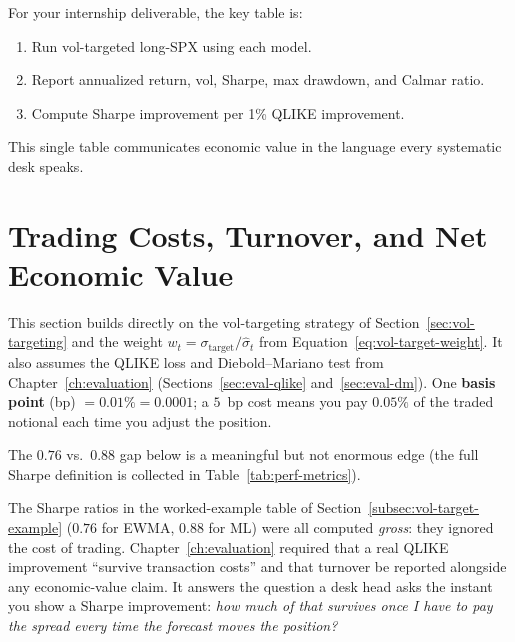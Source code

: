 \begin{application}
For your internship deliverable, the key table is:
\begin{enumerate}
  \item Run vol-targeted long-SPX using each model.
  \item Report annualized return, vol, Sharpe, max drawdown, and Calmar ratio.
  \item Compute Sharpe improvement per 1\% QLIKE improvement.
\end{enumerate}
This single table communicates economic value in the language every systematic desk speaks.
\end{application}

\section{Trading Costs, Turnover, and Net Economic Value}
\label{sec:net-econ-value}

\begin{prereq}[Background]
This section builds directly on the vol-targeting strategy of Section~\ref{sec:vol-targeting} and the weight $w_t = \sigma_{\text{target}}/\hat\sigma_t$ from Equation~\eqref{eq:vol-target-weight}. It also assumes the QLIKE loss and Diebold--Mariano test from Chapter~\ref{ch:evaluation} (Sections~\ref{sec:eval-qlike} and~\ref{sec:eval-dm}). One \textbf{basis point} (bp) $= 0.01\% = 0.0001$; a $5$~bp cost means you pay $0.05\%$ of the traded notional each time you adjust the position.
\end{prereq}

\begin{intuition}
The $0.76$ vs.\ $0.88$ gap below is a meaningful but not enormous edge (the full Sharpe definition is collected in Table~\ref{tab:perf-metrics}).
\end{intuition}

The Sharpe ratios in the worked-example table of Section~\ref{subsec:vol-target-example} ($0.76$ for EWMA, $0.88$ for ML) were all computed \emph{gross}: they ignored the cost of trading. Chapter~\ref{ch:evaluation} required that a real QLIKE improvement ``survive transaction costs'' and that turnover be reported alongside any economic-value claim. It answers the question a desk head asks the instant you show a Sharpe improvement: \emph{how much of that survives once I have to pay the spread every time the forecast moves the position?}

